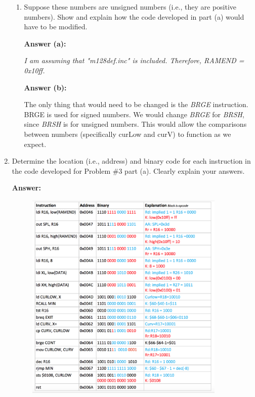 \documentclass[12pt,letterpaper]{article}
\begin{document}
\begin{enumerate}
\begin{enumerate}
 		
 		\item
 		Suppose these numbers are unsigned numbers (i.e., they are positive numbers). Show and explain how
 		the code developed in part (a) would have to be modified. 

 		\clearpage
 		
 		\textbf{Answer (a):}
 		
		\textit{I am assuming that "m128def.inc" is included. Therefore, RAMEND = 0x10ff.}
 		
 		
 		
 		\textbf{Answer (b):}
 		
 		The only thing that would need to be changed is the \textit{BRGE} instruction.
 		BRGE is used for signed numbers.
 		We would change \textit{BRGE} for \textit{BRSH}, since \textit{BRSH} is for unsigned numbers.
 		This would allow the comparisons between numbers (specifically curLow and curV) to function as we expect.
 		
 	\end{enumerate}
		
	\clearpage
	
	\item
	Determine the location (i.e., address) and binary code for each instruction in the code developed for Problem \#3 part (a). 
	Clearly explain your answers. 
	
	\textbf{Answer:}
	
	\begin{figure}[h]
		\centering
		\includegraphics[width=0.9\textwidth]{Q4Answ.png}
	\end{figure}
	
\end{enumerate}


       
\end{document}
